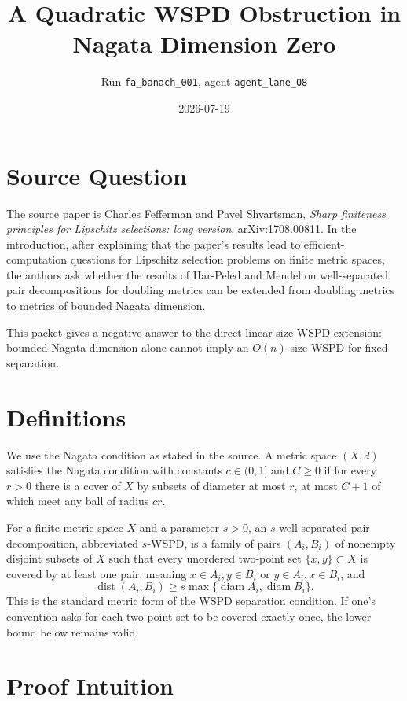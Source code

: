 \documentclass[11pt]{article}
\title{A Quadratic WSPD Obstruction in Nagata Dimension Zero}
\author{Run \texttt{fa\_banach\_001}, agent \texttt{agent\_lane\_08}}
\date{2026-07-19}
\newcommand{\diam}{\operatorname{diam}}
\newcommand{\dist}{\operatorname{dist}}
\begin{document}
\maketitle

\section*{Source Question}

The source paper is Charles Fefferman and Pavel Shvartsman,
\emph{Sharp finiteness principles for Lipschitz selections: long version},
arXiv:1708.00811. In the introduction, after explaining that the paper's
results lead to efficient-computation questions for Lipschitz selection
problems on finite metric spaces, the authors ask whether the results of
Har-Peled and Mendel on well-separated pair decompositions for doubling
metrics can be extended from doubling metrics to metrics of bounded Nagata
dimension.

This packet gives a negative answer to the direct linear-size WSPD extension:
bounded Nagata dimension alone cannot imply an \(O(n)\)-size WSPD for fixed
separation.

\section*{Definitions}

We use the Nagata condition as stated in the source. A metric space \((X,d)\)
satisfies the Nagata condition with constants \(c\in(0,1]\) and \(C\ge 0\) if
for every \(r>0\) there is a cover of \(X\) by subsets of diameter at most
\(r\), at most \(C+1\) of which meet any ball of radius \(cr\).

For a finite metric space \(X\) and a parameter \(s>0\), an \(s\)-well-separated
pair decomposition, abbreviated \(s\)-WSPD, is a family of pairs
\((A_i,B_i)\) of nonempty disjoint subsets of \(X\) such that every unordered
two-point set \(\{x,y\}\subset X\) is covered by at least one pair, meaning
\(x\in A_i,y\in B_i\) or \(y\in A_i,x\in B_i\), and
\[
  \dist(A_i,B_i)\ge s\max\{\diam A_i,\diam B_i\}.
\]
This is the standard metric form of the WSPD separation condition. If one's
convention asks for each two-point set to be covered exactly once, the lower
bound below remains valid.

\section*{Proof Intuition}
\end{document}
